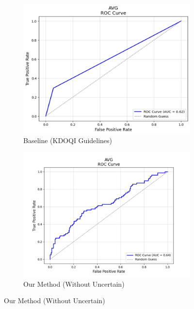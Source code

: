 \documentclass{ieeeaccess}
\begin{document}
\begin{figure}[H]
    \centering
    \begin{subfigure}[b]{0.32\textwidth} %
        \centering
        \includegraphics[width=\linewidth]{AVG_baseline_roc.png}
        \caption{Baseline (KDOQI Guidelines)}
        \label{fig:vascular-access-roc}
    \end{subfigure}
    \hfill %
    \begin{subfigure}[b]{0.32\textwidth}
        \centering
        \includegraphics[width=\linewidth]{AVG_method1_roc.png}
        \caption{Our Method (Without Uncertain)}
        \label{fig:pta-symptom-method1-roc}

\end{subfigure}
\end{figure}
\end{document}
